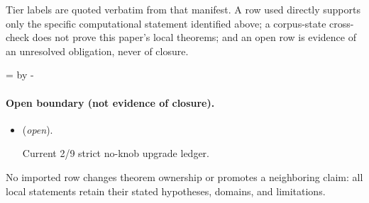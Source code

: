 \documentclass[11pt]{article}
\begin{document}
Tier labels are quoted verbatim from that manifest. A row used directly supports only the specific computational statement identified above; a corpus-state cross-check does not prove this paper's local theorems; and an open row is evidence of an unresolved obligation, never of closure.

\par\begingroup{}=\pagegoal\advance{} by -\pagetotal\ifdim\dimen0<7\baselineskip\newpage\fi\endgroup
\paragraph{Open boundary (not evidence of closure).}
\begin{itemize}
\setlength{\itemsep}{0.25em}
\item {} (\emph{open}).\par Current 2/9 strict no-knob upgrade ledger.
\end{itemize}

No imported row changes theorem ownership or promotes a neighboring claim: all local statements retain their stated hypotheses, domains, and limitations.
\end{document}
